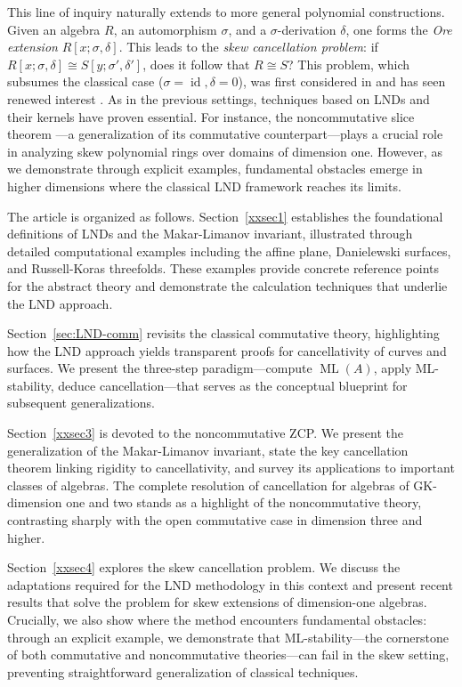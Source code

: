 \documentclass{amsart}
\theoremstyle{plain}
\numberwithin{theorem}{section}
\numberwithin{equation}{theorem}
\theoremstyle{definition}
\DeclareMathOperator{\ML}{ML}
\begin{document}
This line of inquiry naturally extends to more general polynomial constructions. 
Given an algebra $R$, an automorphism $\sigma$, and a $\sigma$-derivation $\delta$, 
one forms the \emph{Ore extension} $R[x; \sigma, \delta]$. This leads to the 
\emph{skew cancellation problem}: if $R[x; \sigma, \delta] \cong S[y; \sigma', 
\delta']$, does it follow that $R \cong S$? This problem, which subsumes the 
classical case ($\sigma=\operatorname{id}, \delta=0$), was first considered in 
\cite{AKP} and has seen renewed interest \cite{BHHV,Ber, TZZ}. As in the previous 
settings, techniques based on LNDs and their kernels have proven essential. For 
instance, the noncommutative slice theorem \cite[Lemma 3.1]{BHHV}---a 
generalization of its commutative counterpart---plays a crucial role in analyzing 
skew polynomial rings over domains of dimension one. However, as we demonstrate 
through explicit examples, fundamental obstacles emerge in higher dimensions where 
the classical LND framework reaches its limits.



The article is organized as follows. Section~\ref{xxsec1} establishes the 
foundational definitions of LNDs and the Makar-Limanov invariant, illustrated 
through detailed computational examples including the affine plane, Danielewski 
surfaces, and Russell-Koras threefolds. These examples provide concrete reference 
points for the abstract theory and demonstrate the calculation techniques that 
underlie the LND approach.

Section~\ref{sec:LND-comm} revisits the classical commutative theory, highlighting 
how the LND approach yields transparent proofs for cancellativity of curves and 
surfaces. We present the three-step paradigm—compute $\ML(A)$, apply ML-stability, 
deduce cancellation—that serves as the conceptual blueprint for subsequent 
generalizations.

Section~\ref{xxsec3} is devoted to the noncommutative ZCP. We present the 
generalization of the Makar-Limanov invariant, state the key cancellation theorem 
linking rigidity to cancellativity, and survey its applications to important 
classes of algebras. The complete resolution of cancellation for algebras of 
GK-dimension one and two stands as a highlight of the noncommutative theory, 
contrasting sharply with the open commutative case in dimension three and higher.

Section~\ref{xxsec4} explores the skew cancellation problem. We discuss the 
adaptations required for the LND methodology in this context and present recent 
results that solve the problem for skew extensions of dimension-one algebras. 
Crucially, we also show where the method encounters fundamental obstacles: through 
an explicit example, we demonstrate that ML-stability—the cornerstone of both 
commutative and noncommutative theories—can fail in the skew setting, preventing 
straightforward generalization of classical techniques.
\end{document}
